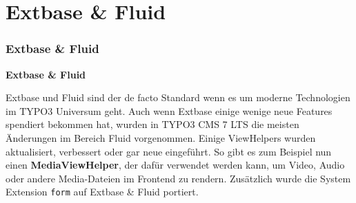 %

\section{Extbase \& Fluid}
\begin{frame}[fragile]
	\frametitle{Extbase \& Fluid}

	\begin{center}\huge{\color{typo3darkgrey}\textbf{Extbase \& Fluid}}\end{center}

	Extbase und Fluid sind der de facto Standard wenn es um moderne Technologien im
	TYPO3 Universum geht. Auch wenn Extbase einige wenige neue Features spendiert
	bekommen hat, wurden in TYPO3 CMS 7 LTS die meisten Änderungen im Bereich Fluid
	vorgenommen.\newline
	Einige ViewHelpers wurden aktualisiert, verbessert oder gar neue eingeführt. So gibt
	es zum Beispiel nun einen \textbf{MediaViewHelper}, der dafür verwendet werden kann,
	um Video, Audio oder andere Media-Dateien im Frontend zu rendern.\newline
	Zusätzlich wurde die System Extension \texttt{form} auf Extbase \& Fluid portiert.

\end{frame}

